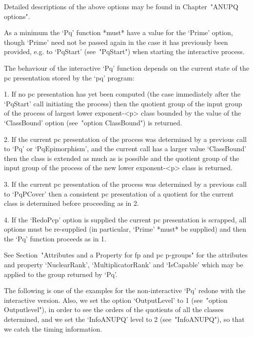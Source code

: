 Detailed descriptions of the above options may be found in Chapter~"ANUPQ
options".

As a minimum the `Pq' function  *must*  have  a  value  for  the  `Prime'
option, though `Prime' need not be  passed  again  in  the  case  it  has
previously been provided, e.g. to `PqStart' (see~"PqStart") when starting
the interactive process.

The behaviour of the interactive `Pq' function  depends  on  the  current
state of the pc presentation stored by the `pq' program:

\beginlist%

\item{1.}
If no pc presentation has yet been computed (the case  immediately  after
the `PqStart' call initiating the process) then the quotient group of the
input group of the process of largest lower exponent-<p> class bounded by
the  value  of  the  `ClassBound'  option  (see~"option  ClassBound")  is
returned.

\item{2.}
If the current pc  presentation  of  the  process  was  determined  by  a
previous call to `Pq' or `PqEpimorphism', and  the  current  call  has  a
larger value `ClassBound' then the  class  is  extended  as  much  as  is
possible and the quotient group of the input group of the process of  the
new lower exponent-<p> class is returned.

\item{3.}
If the current pc  presentation  of  the  process  was  determined  by  a
previous call to `PqPCover'  then  a  consistent  pc  presentation  of  a
quotient for the current class is determined before proceeding as in 2.

\item{4.}
If the `RedoPcp' option  is  supplied  the  current  pc  presentation  is
scrapped, all options must be re-supplied (in particular, `Prime'  *must*
be supplied) and then the `Pq' function proceeds as in 1.

\endlist

See Section~"Attributes and a Property for fp and pc  p-groups"  for  the
attributes   and   property   `NuclearRank',   `MultiplicatorRank'    and
`IsCapable' which may be applied to the group returned by `Pq'.

The following is one of the examples for the non-interactive `Pq'  redone
with the interactive version. Also, we set the option `OutputLevel' to  1
(see~"option   Outputlevel"), in order to see the orders of the quotients
of all the classes determined, and we set  the  `InfoANUPQ'  level  to  2
(see~"InfoANUPQ"), so that we catch the timing information.

